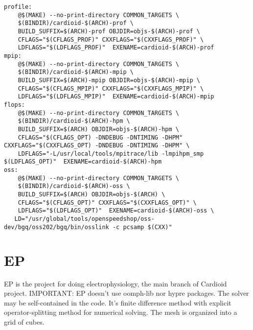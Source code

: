 \begin{verbatim}
profile:
    @$(MAKE) --no-print-directory COMMON_TARGETS \
    $(BINDIR)/cardioid-$(ARCH)-prof \
    BUILD_SUFFIX=$(ARCH)-prof OBJDIR=objs-$(ARCH)-prof \
    CFLAGS="$(CFLAGS_PROF)" CXXFLAGS="$(CXXFLAGS_PROF)" \
    LDFLAGS="$(LDFLAGS_PROF)"  EXENAME=cardioid-$(ARCH)-prof
mpip:
    @$(MAKE) --no-print-directory COMMON_TARGETS \
    $(BINDIR)/cardioid-$(ARCH)-mpip \
    BUILD_SUFFIX=$(ARCH)-mpip OBJDIR=objs-$(ARCH)-mpip \
    CFLAGS="$(CFLAGS_MPIP)" CXXFLAGS="$(CXXFLAGS_MPIP)" \
    LDFLAGS="$(LDFLAGS_MPIP)"  EXENAME=cardioid-$(ARCH)-mpip
flops:
    @$(MAKE) --no-print-directory COMMON_TARGETS \
    $(BINDIR)/cardioid-$(ARCH)-hpm \
    BUILD_SUFFIX=$(ARCH) OBJDIR=objs-$(ARCH)-hpm \
    CFLAGS="$(CFLAGS_OPT) -DNDEBUG -DNTIMING -DHPM" CXXFLAGS="$(CXXFLAGS_OPT) -DNDEBUG -DNTIMING -DHPM" \
    LDFLAGS="-L/usr/local/tools/mpitrace/lib -lmpihpm_smp $(LDFLAGS_OPT)"  EXENAME=cardioid-$(ARCH)-hpm 
oss:
    @$(MAKE) --no-print-directory COMMON_TARGETS \
    $(BINDIR)/cardioid-$(ARCH)-oss \
    BUILD_SUFFIX=$(ARCH) OBJDIR=objs-$(ARCH) \
    CFLAGS="$(CFLAGS_OPT)" CXXFLAGS="$(CXXFLAGS_OPT)" \
    LDFLAGS="$(LDFLAGS_OPT)"  EXENAME=cardioid-$(ARCH)-oss \
   LD="/usr/global/tools/openspeedshop/oss-dev/bgq/oss202/bgq/bin/osslink -c pcsamp $(CXX)"
\end{verbatim}


\section{EP}
\label{sec:EP}

EP is the project for doing electrophysiology, the main branch of Cardioid
project.  IMPORTANT: EP doesn't use oomph-lib nor hypre packages. The solver may
be self-contained in the code. It's finite difference method with explicit
operator-splitting method for numerical solving. The mesh is organized into
a grid of cubes.

